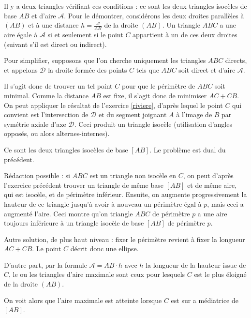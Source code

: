 \begin{Soln}{69}
Il y a deux triangles vérifiant ces conditions : ce sont les deux triangles isocèles de base $AB$ et d'aire $\mathcal A$. Pour le démontrer, considérons les deux droites parallèles à $(AB)$ et à une distance $h =\frac{\mathcal A}{ AB}$ de la droite $(AB)$. Un triangle $ABC$ a une aire égale à $\mathcal A$ si et seulement si le point $C$ appartient à un de ces deux droites (suivant s'il est direct ou indirect).

Pour simplifier, supposons que l'on cherche uniquement les triangles $ABC$ directs, et appelons $\mathcal D$ la droite formée des points $C$ tels que $ABC$ soit direct et d'aire $\mathcal A$.

Il s'agit donc de trouver un tel point $C$ pour que le périmètre de $ABC$ soit minimal. Comme la distance $AB$ est fixe, il s'agit donc de minimiser $AC+CB$. On peut appliquer le résultat de l'exercice \ref{riviere}, d'après lequel le point $C$ qui convient est l'intersection de $\mathcal D$ et du segment joignant $A$ à l'image de $B$ par symétrie axiale d'axe $\mathcal D$. Ceci produit un triangle isocèle (utilisation d'angles opposés, ou alors alternes-internes).
\end{Soln}
\begin{Soln}{70}


Ce sont les deux triangles isocèles de base $[AB]$. Le problème est dual du précédent.

Rédaction possible : si $ABC$ est un triangle non isocèle en $C$, on peut d'après l'exercice précédent trouver un triangle de même base $[AB]$ et de même aire, qui est isocèle, et de périmètre inférieur. Ensuite, on augmente progressivement la hauteur de ce triangle jusqu'à avoir à nouveau un périmètre égal à $p$, mais ceci a augmenté l'aire. Ceci montre qu'on triangle $ABC$ de périmètre $p$ a une aire toujours inférieure à un triangle isocèle de base $[AB]$ de périmètre $p$.



Autre solution, de plus haut niveau : fixer le périmètre revient à fixer la longueur $AC+CB$. Le point $C$ décrit donc une ellipse.

D'autre part,  par la formule $\mathcal A = AB \cdot h$ avec $h$ la longueur de la hauteur issue de $C$, le  ou les triangles d'aire maximale sont ceux pour lesquels $C$ est le plus éloigné de la droite $(AB)$.

On voit alors que l'aire maximale est atteinte lorsque $C$ est sur a médiatrice de $[AB]$.
\end{Soln}
